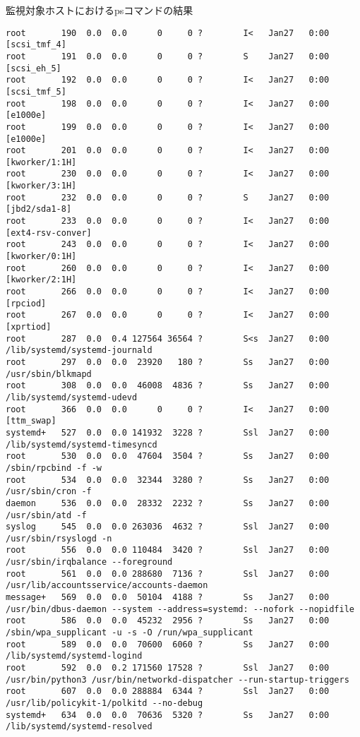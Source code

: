 \begin{itembox}[l]{監視対象ホストにおけるpsコマンドの結果}
\begin{verbatim}
root       190  0.0  0.0      0     0 ?        I<   Jan27   0:00 [scsi_tmf_4]
root       191  0.0  0.0      0     0 ?        S    Jan27   0:00 [scsi_eh_5]
root       192  0.0  0.0      0     0 ?        I<   Jan27   0:00 [scsi_tmf_5]
root       198  0.0  0.0      0     0 ?        I<   Jan27   0:00 [e1000e]
root       199  0.0  0.0      0     0 ?        I<   Jan27   0:00 [e1000e]
root       201  0.0  0.0      0     0 ?        I<   Jan27   0:00 [kworker/1:1H]
root       230  0.0  0.0      0     0 ?        I<   Jan27   0:00 [kworker/3:1H]
root       232  0.0  0.0      0     0 ?        S    Jan27   0:00 [jbd2/sda1-8]
root       233  0.0  0.0      0     0 ?        I<   Jan27   0:00 [ext4-rsv-conver]
root       243  0.0  0.0      0     0 ?        I<   Jan27   0:00 [kworker/0:1H]
root       260  0.0  0.0      0     0 ?        I<   Jan27   0:00 [kworker/2:1H]
root       266  0.0  0.0      0     0 ?        I<   Jan27   0:00 [rpciod]
root       267  0.0  0.0      0     0 ?        I<   Jan27   0:00 [xprtiod]
root       287  0.0  0.4 127564 36564 ?        S<s  Jan27   0:00 /lib/systemd/systemd-journald
root       297  0.0  0.0  23920   180 ?        Ss   Jan27   0:00 /usr/sbin/blkmapd
root       308  0.0  0.0  46008  4836 ?        Ss   Jan27   0:00 /lib/systemd/systemd-udevd
root       366  0.0  0.0      0     0 ?        I<   Jan27   0:00 [ttm_swap]
systemd+   527  0.0  0.0 141932  3228 ?        Ssl  Jan27   0:00 /lib/systemd/systemd-timesyncd
root       530  0.0  0.0  47604  3504 ?        Ss   Jan27   0:00 /sbin/rpcbind -f -w
root       534  0.0  0.0  32344  3280 ?        Ss   Jan27   0:00 /usr/sbin/cron -f
daemon     536  0.0  0.0  28332  2232 ?        Ss   Jan27   0:00 /usr/sbin/atd -f
syslog     545  0.0  0.0 263036  4632 ?        Ssl  Jan27   0:00 /usr/sbin/rsyslogd -n
root       556  0.0  0.0 110484  3420 ?        Ssl  Jan27   0:00 /usr/sbin/irqbalance --foreground
root       561  0.0  0.0 288680  7136 ?        Ssl  Jan27   0:00 /usr/lib/accountsservice/accounts-daemon
message+   569  0.0  0.0  50104  4188 ?        Ss   Jan27   0:00 /usr/bin/dbus-daemon --system --address=systemd: --nofork --nopidfile
root       586  0.0  0.0  45232  2956 ?        Ss   Jan27   0:00 /sbin/wpa_supplicant -u -s -O /run/wpa_supplicant
root       589  0.0  0.0  70600  6060 ?        Ss   Jan27   0:00 /lib/systemd/systemd-logind
root       592  0.0  0.2 171560 17528 ?        Ssl  Jan27   0:00 /usr/bin/python3 /usr/bin/networkd-dispatcher --run-startup-triggers
root       607  0.0  0.0 288884  6344 ?        Ssl  Jan27   0:00 /usr/lib/policykit-1/polkitd --no-debug
systemd+   634  0.0  0.0  70636  5320 ?        Ss   Jan27   0:00 /lib/systemd/systemd-resolved

\end{verbatim}
\end{itembox}
